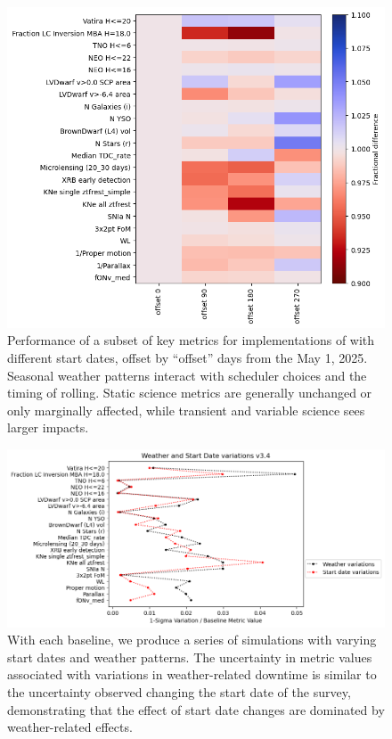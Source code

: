 \begin{figure}
    \centering
    \includegraphics[width=0.9\linewidth]{figures/start_date_scoc_heatmap.png}
    \caption{Performance of a subset of key metrics for implementations of  with different start dates, offset by ``offset'' days from the May 1, 2025. Seasonal weather patterns interact with scheduler choices and the timing of rolling. Static science metrics are generally unchanged or only marginally affected, while transient and variable science sees larger impacts. }
    \label{fig:start_dates}
\end{figure}


\begin{figure}
    \centering
    \includegraphics[width=0.95\linewidth]{figures/uncertainties_v3.4.png}
    \caption{With each baseline, we produce a series of simulations with varying start dates and weather patterns. The uncertainty in metric values associated with variations in weather-related downtime is similar to the uncertainty observed changing the start date of the survey, demonstrating that the effect of start date changes are dominated by weather-related effects.}
    \label{fig:startdates_weather}
\end{figure}
\clearpage